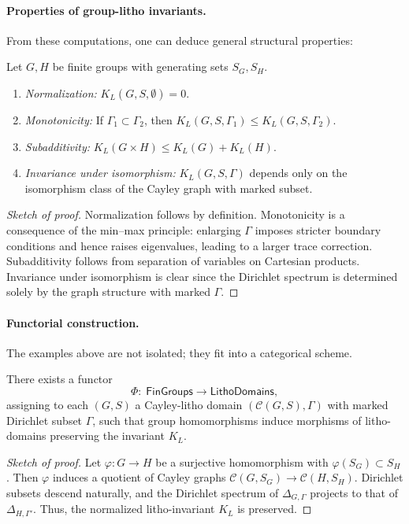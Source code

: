 \paragraph{Properties of group-litho invariants.}
From these computations, one can deduce general structural properties:

\begin{proposition}
Let $G,H$ be finite groups with generating sets $S_G,S_H$.
\begin{enumerate}
\item \emph{Normalization:} $K_L(G,S,\emptyset)=0$.
\item \emph{Monotonicity:} If $\Gamma_1\subset\Gamma_2$,
then $K_L(G,S,\Gamma_1)\le K_L(G,S,\Gamma_2)$.
\item \emph{Subadditivity:} $K_L(G\times H) \le K_L(G)+K_L(H)$.
\item \emph{Invariance under isomorphism:} $K_L(G,S,\Gamma)$
depends only on the isomorphism class of the Cayley graph with marked subset.
\end{enumerate}
\end{proposition}

\begin{proof}[Sketch of proof]
Normalization follows by definition. Monotonicity is a consequence of
the min–max principle: enlarging $\Gamma$ imposes stricter boundary
conditions and hence raises eigenvalues, leading to a larger trace
correction. Subadditivity follows from separation of variables on
Cartesian products. Invariance under isomorphism is clear since the
Dirichlet spectrum is determined solely by the graph structure with
marked $\Gamma$.
\end{proof}

\paragraph{Functorial construction.}
The examples above are not isolated; they fit into a categorical scheme.

\begin{proposition}[Functoriality]
There exists a functor
\[
\Phi:\;\mathsf{FinGroups}\to \mathsf{LithoDomains},
\]
assigning to each $(G,S)$ a Cayley-litho domain $(\mathcal{C}(G,S),\Gamma)$
with marked Dirichlet subset $\Gamma$, such that group homomorphisms
induce morphisms of litho-domains preserving the invariant $K_L$.
\end{proposition}

\begin{proof}[Sketch of proof]
Let $\varphi:G\to H$ be a surjective homomorphism with $\varphi(S_G)\subset S_H$.
Then $\varphi$ induces a quotient of Cayley graphs
$\mathcal{C}(G,S_G)\to \mathcal{C}(H,S_H)$. Dirichlet subsets descend
naturally, and the Dirichlet spectrum of $\Delta_{G,\Gamma}$ projects
to that of $\Delta_{H,\Gamma'}$. Thus, the normalized litho-invariant
$K_L$ is preserved.
\end{proof}


